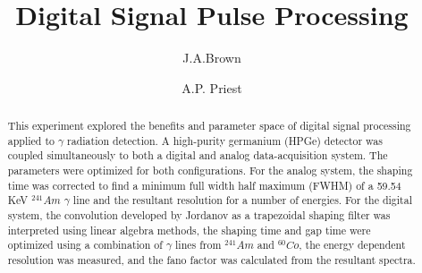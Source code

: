 \documentclass[twocolumn,preprintnumbers,superscriptaddress,amsmath,amssymb,floatfix]{revtex4-1}
\begin{document}
\preprint{}

\title{Digital Signal Pulse Processing}

\author{J.A.Brown}

\author{A.P. Priest}

             
\begin{abstract}
\noindent This experiment explored the benefits and parameter space of digital signal processing applied to $\gamma$ radiation detection. A high-purity germanium (HPGe) detector was coupled simultaneously to both a digital and analog data-acquisition system. The parameters were optimized for both configurations. For the analog system, the shaping time was corrected to find a minimum full width half maximum (FWHM) of a 59.54 KeV $^{241}Am$ $\gamma$ line and the resultant resolution for a number of energies. For the digital system, the convolution developed by Jordanov \cite{jordanov_1} as a trapezoidal shaping filter was interpreted using linear algebra methods, the shaping time and gap time were optimized using a combination of $\gamma$ lines from  $^{241}Am$ and $^{60}Co$, the energy dependent resolution was measured, and the fano factor was calculated from the resultant spectra.
\end{abstract}


\maketitle
\end{document}
